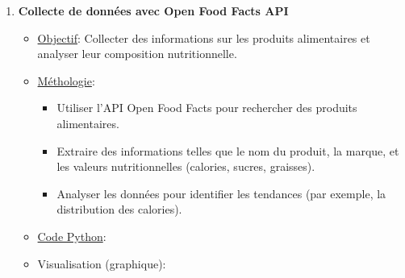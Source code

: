 \documentclass[a4paper,11pt]{article}
\begin{document}
\begin{enumerate}
                \item \textbf{Collecte de données avec Open Food Facts API}
                    \begin{itemize}
                        \item \underline{Objectif}: Collecter des informations sur les produits alimentaires et analyser leur composition nutritionnelle.
                        \item \underline{Méthologie}:
                            \begin{itemize}
                                \item Utiliser l'API Open Food Facts pour rechercher des produits alimentaires.
                                \item Extraire des informations telles que le nom du produit, la marque, et les valeurs nutritionnelles (calories, sucres, graisses).
                                \item Analyser les données pour identifier les tendances (par exemple, la distribution des calories).
                            \end{itemize}
                        \item \underline{Code Python}: 
                            
                        \item Visualisation (graphique):
                            \begin{figure}[ht]
                            \end{figure}
                    \end{itemize}
            \end{enumerate}
\end{document}
